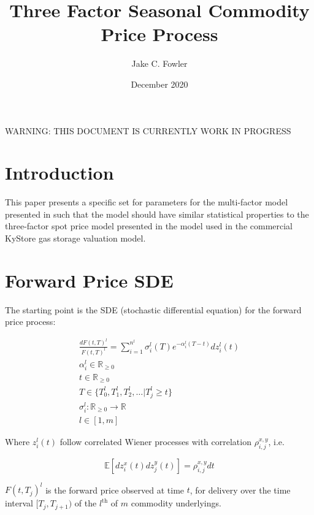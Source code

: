 \documentclass{article}
\title{Three Factor Seasonal Commodity Price Process}
\author{Jake C. Fowler}
\date{December 2020}
\begin{document}
\newcommand{\+}[1]{\ensuremath{\mathbf{#1}}}

\maketitle

WARNING: THIS DOCUMENT IS CURRENTLY WORK IN PROGRESS

\tableofcontents

\newpage

\section{Introduction}
This paper presents a specific set for parameters for the multi-factor model presented in \cite{Fowler}
such that the model should have similar statistical properties to the three-factor spot price
model presented in \cite{Boogert} the model used in the commercial KyStore gas storage valuation model. 


\section{Forward Price SDE}
The starting point is the SDE (stochastic differential equation) for the forward
price process:

\begin{align}
    \label{eq:forward_sde}
    \frac{dF(t, T)^l}{F(t, T)^l}=\sum_{i=1}^{n^l} \sigma_i^l(T)e^{-\alpha_i^l(T-t)}dz_i^l(t) \\
    \nonumber
    \alpha_i^l \in \mathbb{R}_{\ge 0} \\
    \nonumber
    t \in \mathbb{R}_{\ge 0} \\
    \nonumber
    T \in \{ T_0^l, T_1^l, T_2^l, \hdots | T_j^l \ge t  \} \\
    \nonumber
    \sigma_i^l : \mathbb{R}_{\ge 0} \rightarrow \mathbb{R} \\
    \nonumber
    l \in [1, m]
\end{align}

Where $z_i^l(t)$ follow correlated Wiener processes with correlation $\rho_{i, j}^{x, y}$, i.e.

\begin{equation}
    \mathbb{E}[dz_i^x(t)dz_j^y(t)] = \rho_{i, j}^{x, y}dt
\end{equation}

$F(t, T_j)^l$ is the forward price observed at time $t$, for delivery over the time 
interval $[T_j, T_{j+1})$ of the $l^{\text{th}}$ of $m$ commodity underlyings.
\end{document}
